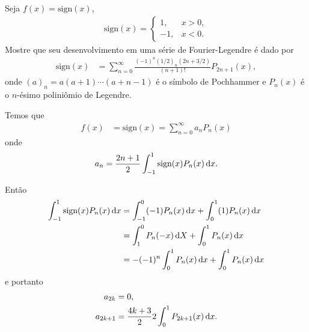\documentclass[a4paper,12pt, leqno, answers]{exam}
\begin{document}
\begin{questions}
    \question[P1 de 2006] Seja $f(x) = \text{sign}(x)$,
    \begin{align*}
        \text{sign}(x) = \begin{cases}
            1, & x > 0, \\
            -1, & x < 0.
        \end{cases}
    \end{align*}
    Mostre que seu desenvolvimento em uma série de Fourier-Legendre é dado por
    \begin{align*}
        \text{sign}(x) &= \sum_{n = 0}^\infty \frac{(-1)^n (1/2)_n (2n + 3/2)}{(n + 1)!} P_{2n + 1}(x),
    \end{align*}
    onde $(a)_n = a (a + 1) \cdots (a + n - 1)$ é o s\'{i}mbolo de Pochhammer e $P_n(x)$ é o $n$-ésimo polini\^{o}mio de Legendre.
    \begin{solution}
        Temos que
        \begin{align*}
            f(x) &= \text{sign}(x) = \sum_{n = 0}^\infty a_n P_n(x)
        \end{align*}
        onde
        \begin{align*}
            a_n = \frac{2n + 1}{2} \int_{-1}^1 \text{sign}(x) P_n(x) \, \mathrm{d}x.
        \end{align*}

        Então
        \begin{align*}
            \int_{-1}^1 \text{sign}(x) P_n(x) \, \mathrm{d}x &= \int_{-1}^0 (-1) P_n(x) \, \mathrm{d}x + \int_0^1 (1) P_n(x) \, \mathrm{d}x \\
            &= \int_1^0 P_n(-x) \, \mathrm{d}X + \int_0^1 P_n(x) \, \mathrm{d}x \\
            &= -(-1)^n \int_0^1 P_n(x) \, \mathrm{d}x + \int_0^1 P_n(x) \, \mathrm{d}x
        \end{align*}
        e portanto
        \begin{align*}
            a_{2k} &= 0, \\
            a_{2k+1} &= \frac{4k + 3}{2} 2 \int_0^1 P_{2k+1}(x) \, \mathrm{d}x.
        \end{align*}


\end{solution}
\end{questions}
\end{document}
